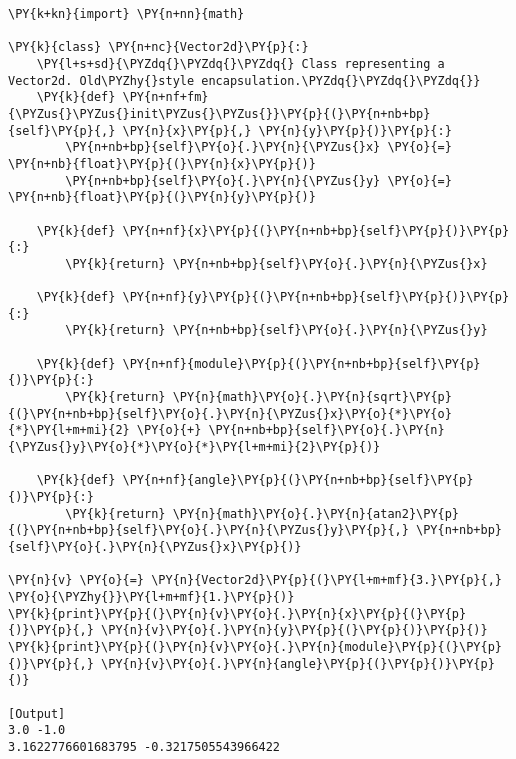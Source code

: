 \begin{Verbatim}[label=\makebox{\url{https://github.com/lucabaldini/cmepda/tree/master/slides/latex/snippets/vector2d\_old\_enc.py}},commandchars=\\\{\}]
\PY{k+kn}{import} \PY{n+nn}{math}

\PY{k}{class} \PY{n+nc}{Vector2d}\PY{p}{:}
    \PY{l+s+sd}{\PYZdq{}\PYZdq{}\PYZdq{} Class representing a Vector2d. Old\PYZhy{}style encapsulation.\PYZdq{}\PYZdq{}\PYZdq{}}   
    \PY{k}{def} \PY{n+nf+fm}{\PYZus{}\PYZus{}init\PYZus{}\PYZus{}}\PY{p}{(}\PY{n+nb+bp}{self}\PY{p}{,} \PY{n}{x}\PY{p}{,} \PY{n}{y}\PY{p}{)}\PY{p}{:}
        \PY{n+nb+bp}{self}\PY{o}{.}\PY{n}{\PYZus{}x} \PY{o}{=} \PY{n+nb}{float}\PY{p}{(}\PY{n}{x}\PY{p}{)}
        \PY{n+nb+bp}{self}\PY{o}{.}\PY{n}{\PYZus{}y} \PY{o}{=} \PY{n+nb}{float}\PY{p}{(}\PY{n}{y}\PY{p}{)}
   
    \PY{k}{def} \PY{n+nf}{x}\PY{p}{(}\PY{n+nb+bp}{self}\PY{p}{)}\PY{p}{:}
        \PY{k}{return} \PY{n+nb+bp}{self}\PY{o}{.}\PY{n}{\PYZus{}x}
       
    \PY{k}{def} \PY{n+nf}{y}\PY{p}{(}\PY{n+nb+bp}{self}\PY{p}{)}\PY{p}{:}
        \PY{k}{return} \PY{n+nb+bp}{self}\PY{o}{.}\PY{n}{\PYZus{}y}
   
    \PY{k}{def} \PY{n+nf}{module}\PY{p}{(}\PY{n+nb+bp}{self}\PY{p}{)}\PY{p}{:}
        \PY{k}{return} \PY{n}{math}\PY{o}{.}\PY{n}{sqrt}\PY{p}{(}\PY{n+nb+bp}{self}\PY{o}{.}\PY{n}{\PYZus{}x}\PY{o}{*}\PY{o}{*}\PY{l+m+mi}{2} \PY{o}{+} \PY{n+nb+bp}{self}\PY{o}{.}\PY{n}{\PYZus{}y}\PY{o}{*}\PY{o}{*}\PY{l+m+mi}{2}\PY{p}{)}
       
    \PY{k}{def} \PY{n+nf}{angle}\PY{p}{(}\PY{n+nb+bp}{self}\PY{p}{)}\PY{p}{:}
        \PY{k}{return} \PY{n}{math}\PY{o}{.}\PY{n}{atan2}\PY{p}{(}\PY{n+nb+bp}{self}\PY{o}{.}\PY{n}{\PYZus{}y}\PY{p}{,} \PY{n+nb+bp}{self}\PY{o}{.}\PY{n}{\PYZus{}x}\PY{p}{)}
  
\PY{n}{v} \PY{o}{=} \PY{n}{Vector2d}\PY{p}{(}\PY{l+m+mf}{3.}\PY{p}{,} \PY{o}{\PYZhy{}}\PY{l+m+mf}{1.}\PY{p}{)}
\PY{k}{print}\PY{p}{(}\PY{n}{v}\PY{o}{.}\PY{n}{x}\PY{p}{(}\PY{p}{)}\PY{p}{,} \PY{n}{v}\PY{o}{.}\PY{n}{y}\PY{p}{(}\PY{p}{)}\PY{p}{)}
\PY{k}{print}\PY{p}{(}\PY{n}{v}\PY{o}{.}\PY{n}{module}\PY{p}{(}\PY{p}{)}\PY{p}{,} \PY{n}{v}\PY{o}{.}\PY{n}{angle}\PY{p}{(}\PY{p}{)}\PY{p}{)}

[Output]
3.0 -1.0
3.1622776601683795 -0.3217505543966422
\end{Verbatim}